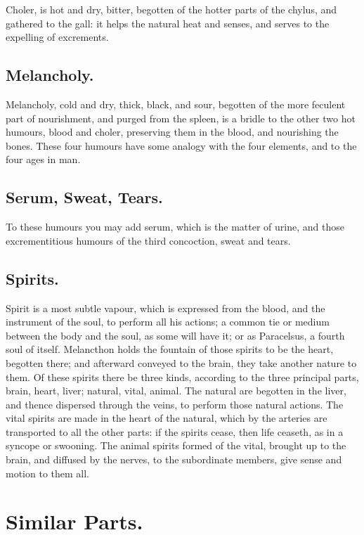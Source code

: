 Choler, is hot and dry, bitter, begotten of the hotter parts of the chylus, and
gathered to the gall: it helps the natural heat and senses, and serves to the
expelling of excrements.

\subsection{Melancholy.}

Melancholy, cold and dry, thick, black, and sour, begotten of the more feculent
part of nourishment, and purged from the spleen, is a bridle to the other two
hot humours, blood and choler, preserving them in the blood, and nourishing the
bones. These four humours have some analogy with the four elements, and to the
four ages in man.

\subsection{Serum, Sweat, Tears.}

To these humours you may add serum, which is the matter of urine, and those
excrementitious humours of the third concoction, sweat and tears.

\subsection{Spirits.}

Spirit is a most subtle vapour, which is expressed from the blood, and the
instrument of the soul, to perform all his actions; a common tie or medium
between the body and the soul, as some will have it; or as
Paracelsus, a fourth soul of itself. Melancthon holds the
fountain of those spirits to be the heart, begotten there; and afterward
conveyed to the brain, they take another nature to them. Of these spirits there
be three kinds, according to the three principal parts, brain, heart, liver;
natural, vital, animal. The natural are begotten in the liver, and thence
dispersed through the veins, to perform those natural actions. The vital
spirits are made in the heart of the natural, which by the arteries are
transported to all the other parts: if the spirits cease, then life ceaseth, as
in a syncope or swooning. The animal spirits formed of the vital, brought up to
the brain, and diffused by the nerves, to the subordinate members, give sense
and motion to them all.

\section{Similar Parts.}

